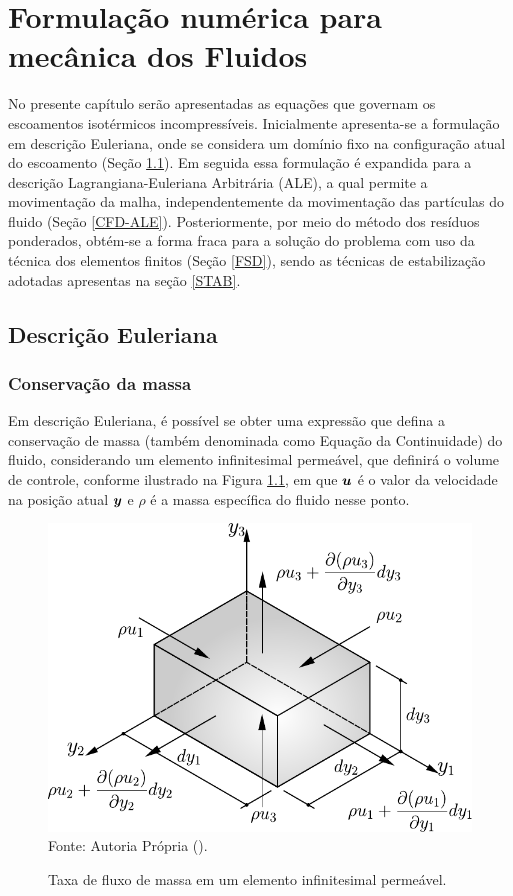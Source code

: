 \chapter{Formulação numérica para mecânica dos Fluidos} \label{EGDF}

No presente capítulo serão apresentadas as equações que governam os escoamentos isotérmicos incompressíveis. Inicialmente apresenta-se a formulação em descrição Euleriana, onde se considera um domínio fixo na configuração atual do escoamento (Seção \ref{CFD-E}). Em seguida essa formulação é expandida para a descrição Lagrangiana-Euleriana Arbitrária (ALE), a qual permite a movimentação da malha, independentemente da movimentação das partículas do fluido (Seção \ref{CFD-ALE}). Posteriormente, por meio do método dos resíduos ponderados, obtém-se a forma fraca para a solução do problema com uso da técnica dos elementos finitos (Seção \ref{FSD}), sendo as técnicas de estabilização adotadas apresentas na seção \ref{STAB}.

\section{Descrição Euleriana} \label{CFD-E}

\subsection{Conservação da massa}
Em descrição Euleriana, é possível se obter uma expressão que defina a conservação de massa (também denominada como Equação da Continuidade) do fluido, considerando um elemento infinitesimal permeável, que definirá o volume de controle, conforme ilustrado na Figura \ref{fig:BalMas}, em que $\boldsymbol{u}$ é o valor da velocidade na posição atual $\boldsymbol{y}$ e $\rho$ é a massa específica do fluido nesse ponto.

\begin{figure}[h!]
    \centering
    \caption{Taxa de fluxo de massa em um elemento infinitesimal permeável.}
    \includegraphics[width=.5\linewidth]{Figuras/BalMas.pdf}
    \\Fonte: Autoria Própria (\the\year).
    \label{fig:BalMas}
\end{figure}

